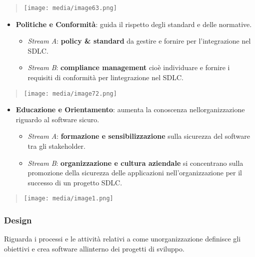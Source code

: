 \begin{quote}
\texttt{[image: media/image63.png]}
\end{quote}

\begin{itemize}
\item
  \textbf{Politiche e Conformità}: guida il rispetto degli standard e
  delle normative.

  \begin{itemize}
  \item
    \emph{Stream A}: \textbf{policy \& standard} da gestire e fornire
    per l'integrazione nel SDLC.
  \item
    \emph{Stream B}: \textbf{compliance management} cioè individuare e
    fornire i requisiti di conformità per l\textquotesingle integrazione
    nel SDLC.
  \end{itemize}
\end{itemize}

\begin{quote}
\texttt{[image: media/image72.png]}
\end{quote}

\begin{itemize}
\item
  \textbf{Educazione e Orientamento}: aumenta la conoscenza
  nell\textquotesingle organizzazione riguardo al software sicuro.

  \begin{itemize}
  \item
    \emph{Stream A}: \textbf{formazione e sensibilizzazione} sulla
    sicurezza del software tra gli stakeholder.
  \item
    \emph{Stream B}: \textbf{organizzazione e cultura aziendale} si
    concentrano sulla promozione della sicurezza delle applicazioni
    nell'organizzazione per il successo di un progetto SDLC.
  \end{itemize}
\end{itemize}

\begin{quote}
\texttt{[image: media/image1.png]}
\end{quote}

\subsubsection{Design}\label{design}

Riguarda i processi e le attività relativi a come
un\textquotesingle organizzazione definisce gli obiettivi e crea
software all\textquotesingle interno dei progetti di sviluppo.

